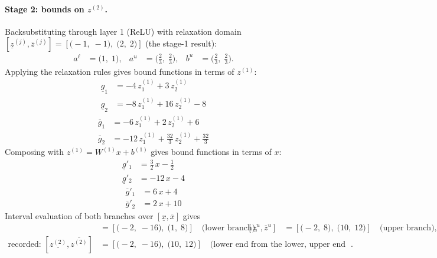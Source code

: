 \documentclass[11pt]{article}
\begin{document}
\paragraph{Stage 2: bounds on $z^{(2)}$.}
Backsubstituting through layer 1 (ReLU) with relaxation domain $[\underline{z}^{(j)}, \overline{z}^{(j)}] = [\bigl(-1,\; -1\bigr),\; \bigl(2,\; 2\bigr)]$ (the stage-1 result):
\begin{align*}
a^{\ell} &= \bigl(1,\; 1\bigr), & a^{u} &= \bigl(\frac{2}{3},\; \frac{2}{3}\bigr), & b^{u} &= \bigl(\frac{2}{3},\; \frac{2}{3}\bigr).
\end{align*}
Applying the relaxation rules gives bound functions in terms of $z^{(1)}$:
\begin{align*}
\underline{g}_{1} &= -4\,z^{(1)}_{1} + 3\,z^{(1)}_{2} \\
\underline{g}_{2} &= -8\,z^{(1)}_{1} + 16\,z^{(1)}_{2} - 8
\end{align*}
\begin{align*}
\overline{g}_{1} &= -6\,z^{(1)}_{1} + 2\,z^{(1)}_{2} + 6 \\
\overline{g}_{2} &= -12\,z^{(1)}_{1} + \frac{32}{3}\,z^{(1)}_{2} + \frac{32}{3}
\end{align*}
Composing with $z^{(1)} = W^{(1)} x + b^{(1)}$ gives bound functions in terms of $x$:
\begin{align*}
\underline{g}'_{1} &= \frac{3}{2}\,x - \frac{1}{2} \\
\underline{g}'_{2} &= -12\,x - 4
\end{align*}
\begin{align*}
\overline{g}'_{1} &= 6\,x + 4 \\
\overline{g}'_{2} &= 2\,x + 10
\end{align*}
Interval evaluation of both branches over $[\underline{x}, \overline{x}]$ gives
\begin{align*}
[\underline{z}^{\ell}, \overline{z}^{\ell}] &= [\bigl(-2,\; -16\bigr),\; \bigl(1,\; 8\bigr)] \quad\text{(lower branch)}, & [\underline{z}^{u}, \overline{z}^{u}] &= [\bigl(-2,\; 8\bigr),\; \bigl(10,\; 12\bigr)] \quad\text{(upper branch)}, \\
\text{recorded: } [\underline{z^{(2)}}, \overline{z^{(2)}}] &= [\bigl(-2,\; -16\bigr),\; \bigl(10,\; 12\bigr)] \quad\text{(lower end from the lower, upper end from the upper branch)}.
\end{align*}
\end{document}
